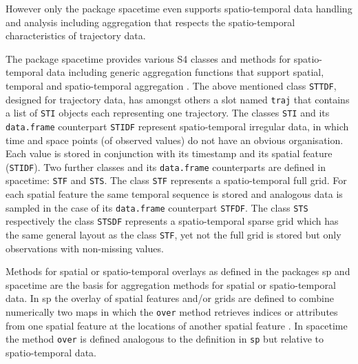 \documentclass[12pt, oneside, a4paper]{scrbook}
\newcommand{\pkg}[1]{{\normalfont\fontseries{b}\selectfont #1}}
\let\code=\texttt
\begin{document}
However only the package \pkg{spacetime} even supports spatio-temporal data handling and analysis including aggregation that respects the spatio-temporal characteristics of trajectory data.
\par\medskip

The package \pkg{spacetime} provides various S4 classes and methods for spatio-temporal data including generic aggregation functions that support spatial, temporal and spatio-temporal aggregation \citep{pebesma_spacetime:_2012}. The above mentioned class \code{STTDF}, designed for trajectory data, has amongst others a slot named \code{traj} that contains a list of \code{STI} objects each representing one trajectory.
The classes \code{STI} and its \code{data.frame} counterpart \code{STIDF} represent spatio-temporal irregular data, in which time and space points (of observed values) do not have an obvious organisation. Each value is stored in conjunction with its timestamp and its spatial feature (\code{STIDF}).
Two further classes and its \code{data.frame} counterparts are defined in \pkg{spacetime}: \code{STF} and \code{STS}. The class \code{STF} represents a spatio-temporal full grid. For each spatial feature the same temporal sequence is stored and analogous data is sampled in the case of its \code{data.frame} counterpart \code{STFDF}.
The class \code{STS} respectively the class \code{STSDF} represents a spatio-temporal sparse grid which has the same general layout as the class \code{STF}, yet not the full grid is stored but only observations with non-missing values.
\par\medskip

Methods for spatial or spatio-temporal overlays as defined in the packages \pkg{sp} \citep{pebesma_sp:_2014} and \pkg{spacetime} \citep{pebesma_spacetime:_2012} are the basis for aggregation methods for spatial or spatio-temporal data. 
In \pkg{sp} the overlay of spatial features and/or grids are defined to combine numerically two maps in which the \code{over} method retrieves indices or attributes from one spatial feature at the locations of another spatial feature \citep{bivand_applied_2008}.
In \pkg{spacetime} the method \code{over} is defined analogous to the definition in \code{sp} but relative to spatio-temporal data.
\par\medskip
\end{document}
